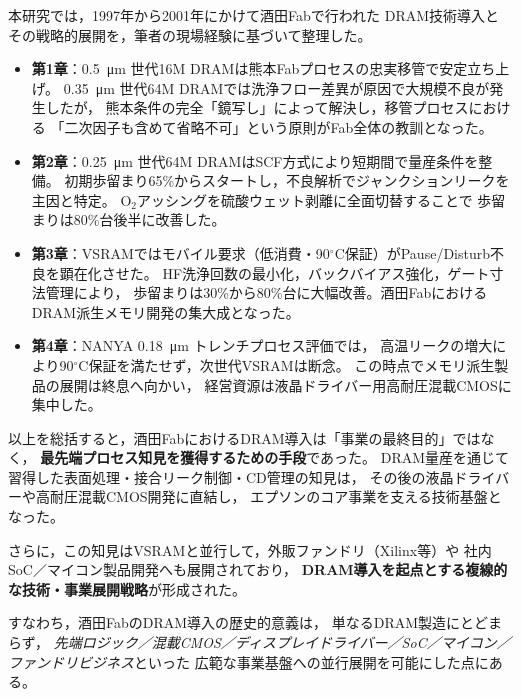 \documentclass[conference]{IEEEtran}
\let\meter\metre
\begin{document}
本研究では，1997年から2001年にかけて酒田Fabで行われた
DRAM技術導入とその戦略的展開を，筆者の現場経験に基づいて整理した。

\begin{itemize}
  \item \textbf{第1章}：\SI{0.5}{\micro\meter} 世代16M DRAMは熊本Fabプロセスの忠実移管で安定立ち上げ。
        \SI{0.35}{\micro\meter} 世代64M DRAMでは洗浄フロー差異が原因で大規模不良が発生したが，
        熊本条件の完全「鏡写し」によって解決し，移管プロセスにおける
        「二次因子も含めて省略不可」という原則がFab全体の教訓となった。
  \item \textbf{第2章}：\SI{0.25}{\micro\meter} 世代64M DRAMはSCF方式により短期間で量産条件を整備。
        初期歩留まり65\%からスタートし，不良解析でジャンクションリークを主因と特定。
        O$_2$アッシングを硫酸ウェット剥離に全面切替することで
        歩留まりは80\%台後半に改善した。
  \item \textbf{第3章}：VSRAMではモバイル要求（低消費・90$^\circ$C保証）がPause/Disturb不良を顕在化させた。
        HF洗浄回数の最小化，バックバイアス強化，ゲート寸法管理により，
        歩留まりは30\%から80\%台に大幅改善。酒田FabにおけるDRAM派生メモリ開発の集大成となった。
  \item \textbf{第4章}：NANYA \SI{0.18}{\micro\meter} トレンチプロセス評価では，
        高温リークの増大により90$^\circ$C保証を満たせず，次世代VSRAMは断念。
        この時点でメモリ派生製品の展開は終息へ向かい，
        経営資源は液晶ドライバー用高耐圧混載CMOSに集中した。
\end{itemize}

\noindent
以上を総括すると，酒田FabにおけるDRAM導入は「事業の最終目的」ではなく，
\textbf{最先端プロセス知見を獲得するための手段}であった。  
DRAM量産を通じて習得した表面処理・接合リーク制御・CD管理の知見は，
その後の液晶ドライバーや高耐圧混載CMOS開発に直結し，
エプソンのコア事業を支える技術基盤となった。

さらに，この知見はVSRAMと並行して，外販ファンドリ（Xilinx等）や
社内SoC／マイコン製品開発へも展開されており，
\textbf{DRAM導入を起点とする複線的な技術・事業展開戦略}が形成された。  

すなわち，酒田FabのDRAM導入の歴史的意義は，
単なるDRAM製造にとどまらず，
\emph{先端ロジック／混載CMOS／ディスプレイドライバー／SoC／マイコン／ファンドリビジネス}といった
広範な事業基盤への並行展開を可能にした点にある。
\end{document}
